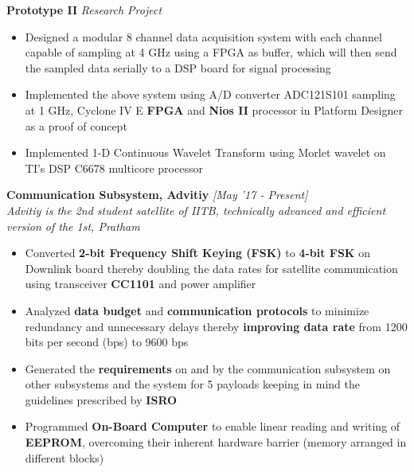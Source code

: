 \documentclass[11pt]{article}%
\begin{document}
\flushleft \textbf{Prototype II} \hfill{\em{Research Project}}  
\vspace{-2mm}
\begin{itemize}[leftmargin=*]
	\setlength\itemsep{0.01em}
    \vspace{0mm}	
    \item Designed a modular 8 channel data acquisition system with each channel capable of sampling at 4 GHz using a FPGA as buffer, which will then send the sampled data serially to a DSP board for signal processing 
    \item Implemented the above system using A/D converter ADC121S101 sampling at 1 GHz, Cyclone IV E \textbf{FPGA} and \textbf{Nios II} processor in Platform Designer as a proof of concept 
    \item Implemented 1-D Continuous Wavelet Transform using Morlet wavelet on TI's DSP C6678 multicore processor
\end{itemize}


{\flushleft \bf \large{Communication Subsystem, Advitiy}} \hfill {{{\em{[May '17 - Present]}}}} \\

 {\flushleft \em{Advitiy is the 2nd student satellite of IITB, technically advanced and efficient version of the 1st, Pratham}}
\vspace{3mm}
\begin{itemize}[leftmargin=*]
	\setlength\itemsep{0.01em}
    \vspace{-5mm}	
    \item Converted \textbf{2-bit Frequency Shift Keying (FSK)} to \textbf{4-bit FSK} on Downlink board thereby doubling the data rates for satellite communication using transceiver \textbf{CC1101} and power amplifier
    \item Analyzed \textbf{data budget} and \textbf{communication protocols} to minimize redundancy and unnecessary delays thereby \textbf{improving data rate} from 1200 bits per second (bps) to 9600 bps
    \item Generated the \textbf{requirements} on and by the communication subsystem on other subsystems and the system for 5 payloads keeping in mind the guidelines prescribed by \textbf{ISRO}
    \item Programmed \textbf{On-Board Computer} to enable linear reading and writing of \textbf{EEPROM}, overcoming their inherent hardware barrier (memory arranged in different blocks) 
    
\end{itemize}
\end{document}
